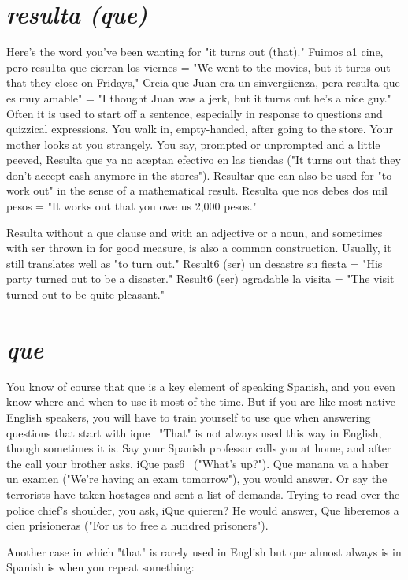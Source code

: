 \section{\emph{resulta (que)}}

Here's the word you've been wanting for "it turns out (that)."
Fuimos a1 cine, pero resu1ta que cierran los viernes = "We went to
the movies, but it turns out that they close on Fridays," Creia que
Juan era un sinvergiienza, pera resulta que es muy amable" = "I
thought Juan was a jerk, but it turns out he's a nice guy." Often it is
used to start off a sentence, especially in response to questions and
quizzical expressions. You walk in, empty-handed, after going to the
store. Your mother looks at you strangely. You say, prompted or unprompted and a little peeved, Resulta que ya no aceptan efectivo en
las tiendas ("It turns out that they don't accept cash anymore in the
stores"). Resultar que can also be used for "to work out" in the sense
of a mathematical result. Resulta que nos debes dos mil pesos = "It
works out that you owe us 2,000 pesos."

Resulta without a que clause and with an adjective or a noun,
and sometimes with ser thrown in for good measure, is also a common
construction. Usually, it still translates well as "to turn out." Result6
(ser) un desastre su fiesta = "His party turned out to be a disaster."
Result6 (ser) agradable la visita = "The visit turned out to be quite
pleasant."

\section{\emph{que}}

You know of course that que is a key element of speaking
Spanish, and you even know where and when to use it-most of the
time. But if you are like most native English speakers, you will have
to train yourself to use que when answering questions that start with
ique~ "That" is not always used this way in English, though sometimes it is. Say your Spanish professor calls you at home, and after the
call your brother asks, iQue pas6~ ("What's up?"). Que manana va a
haber un examen ("We're having an exam tomorrow"), you would answer. Or say the terrorists have taken hostages and sent a list of demands. Trying to read over the police chief's shoulder, you ask, iQue
quieren? He would answer, Que liberemos a cien prisioneras ("For us
to free a hundred prisoners").

Another case in which "that" is rarely used in English but que
almost always is in Spanish is when you repeat something:

